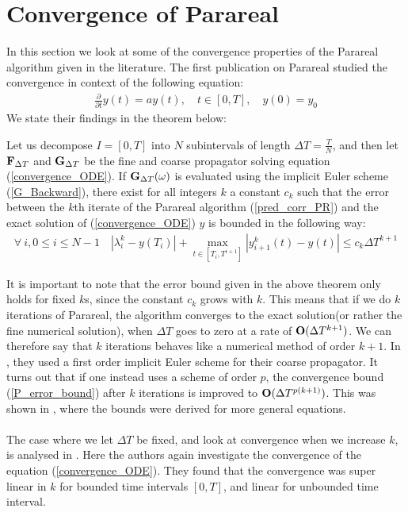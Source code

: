 \section{Convergence of Parareal}
In this section we look at some of the convergence properties of the Parareal algorithm given in the literature. The first publication on Parareal \cite{lions2001resolution} studied the convergence in context of the following equation: 
\begin{align}
\frac{\partial}{\partial t} y(t)=ay(t),\quad t\in [0,T],\quad y(0)=y_0\label{convergence_ODE}
\end{align}
We state their findings in the theorem below:
\begin{theorem}
Let us decompose $I=[0,T]$ into $N$ subintervals of length $\Delta T = \frac{T}{N}$, and then let $\bold F_{\Delta T}$ and $\bold G_{\Delta T}$ be the fine and coarse propagator solving equation (\ref{convergence_ODE}). If $\bold G_{\Delta T}(\omega)$  is evaluated using the implicit Euler scheme (\ref{G_Backward}), there exist for all integers $k$ a constant $c_k$ such that the error between the $k$th iterate of the Parareal algorithm (\ref{pred_corr_PR}) and the exact solution of (\ref{convergence_ODE}) $y$ is bounded in the following way:
\begin{align}
\forall \ i,0\leq i\leq N-1 \quad |\lambda_i^k-y(T_i)| + \max_{t\in[T_{i},T^{i+1}]}|y_{i+1}^k(t)-y(t)| \leq c_k\Delta T^{k+1} \label{P_error_bound}
\end{align}
\end{theorem}
It is important to note that the error bound given in the above theorem only holds for fixed $k$s, since the constant $c_k$ grows with $k$. This means that if we do $k$ iterations of Parareal, the algorithm converges to the exact solution(or rather the fine numerical solution), when $\Delta T$ goes to zero at a rate of $\bold O(\Delta T^{k+1})$. We can therefore say that $k$ iterations behaves like a numerical method of order $k+1$. In \cite{lions2001resolution}, they used a first order implicit Euler scheme for their coarse propagator. It turns out that if one instead uses a scheme of order $p$, the convergence bound (\ref{P_error_bound}) after $k$ iterations is improved to $\bold O(\Delta T^{p(k+1)})$. This was shown in \cite{bal2005convergence}, where the bounds were derived for more general equations. 
\\
\\
The case where we let $\Delta T$ be fixed, and look at convergence when we increase $k$, is analysed in \cite{gander2007analysis}. Here the authors again investigate the convergence of the equation (\ref{convergence_ODE}). They found that the convergence was super linear in $k$ for bounded time intervals $[0,T]$, and linear for unbounded time interval. 